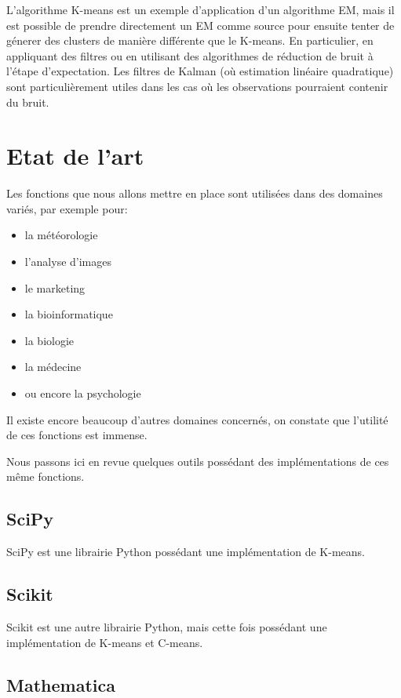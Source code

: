 \documentclass{article}
\begin{document}
      L'algorithme K-means est un exemple d'application d'un algorithme EM, mais il est possible de prendre directement un EM comme source pour ensuite tenter de génerer des clusters de manière différente que le K-means. En particulier, en appliquant des filtres ou en utilisant des algorithmes de réduction de bruit à l'étape d'expectation. Les filtres de Kalman (où estimation linéaire quadratique) sont particulièrement utiles dans les cas où les observations pourraient contenir du bruit.

  \section{Etat de l'art}

  Les fonctions que nous allons mettre en place sont utilisées dans des domaines variés, par exemple pour:
  \begin{itemize}
    \item la météorologie
    \item l'analyse d'images
    \item le marketing
    \item la bioinformatique
    \item la biologie
    \item la médecine
    \item ou encore la psychologie
  \end{itemize}

  Il existe encore beaucoup d'autres domaines concernés, on constate que l'utilité de ces fonctions est immense.


  Nous passons ici en revue quelques outils possédant des implémentations de ces même fonctions.

  \subsection{SciPy}

  SciPy est une librairie Python possédant une implémentation de K-means.

  \subsection{Scikit}

  Scikit est une autre librairie Python, mais cette fois possédant une implémentation de K-means et C-means.

  \subsection{Mathematica}
\end{document}

